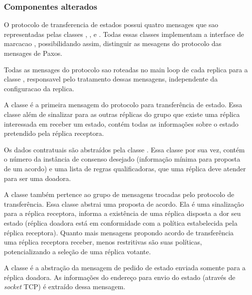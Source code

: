 \subsubsection{Componentes alterados}

O protocolo de transferencia de estados possui quatro mensages que sao representadas pelas
classes , ,  e
. Todas essas classes implementam a interface de marcacao
, possibilidando assim, distinguir as mesagens do
protocolo das mensages de Paxos.

Todas as mensages do protocolo sao roteadas no {main loop} de cada replica para a classe
, responsavel pelo tratamento dessas mensagens, independente da
configuracao da replica.


A classe  é a primeira mensagem do protocolo para transferência
de estado. Essa classe além de sinalizar para as outras réplicas do grupo que existe uma
réplica interessada em receber um estado, contém todas as informações sobre o estado
pretendido pela réplica receptora.

Os dados contratuais são abstraídos pela classe . Essa classe por sua
vez, contém o número da instância de consenso desejado (informação mínima para proposta de
um acordo) e uma lista de regras qualificadoras, que uma réplica deve atender para ser uma
doadora.


A classe  também pertence ao grupo de mensagens trocadas pelo
protocolo de transferência. Essa classe abstrai uma proposta de acordo. Ela é uma
sinalização para a réplica receptora, informa a existência de uma réplica disposta a dor
seu estado (réplica doadora está em conformidade com a política estabelecida pela réplica
receptora). Quanto mais mensagens propondo acordo de transferência uma réplica receptora
receber, menos restritivas são suas políticas, potencializando a seleção de uma réplica
votante.


A classe  é a abstração da mensagem de pedido de estado enviada
somente para a réplica doadora. As informações do endereço para envio do estado (através
de \emph{socket} TCP) é extraído dessa mensagem.

